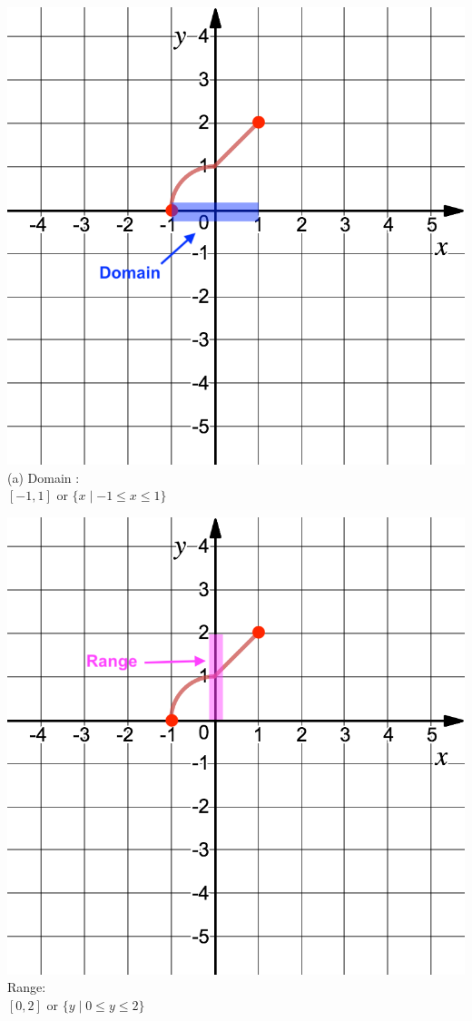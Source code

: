 \noindent\begin{minipage}{0.4\textwidth}%
\includegraphics[width=\linewidth]{Pics/ex4_a_D.png}
(a) Domain :\\ $[-1,1]$ or $\{x \mid -1 \le x \le 1\}$
\end{minipage}%
\hfill%
\begin{minipage}{0.4\textwidth}
\includegraphics[width=\linewidth]{Pics/ex4_a_R.png}
Range:\\ $[0,2]$ or $\{y \mid 0 \le y \le 2\}$
\end{minipage}
%


